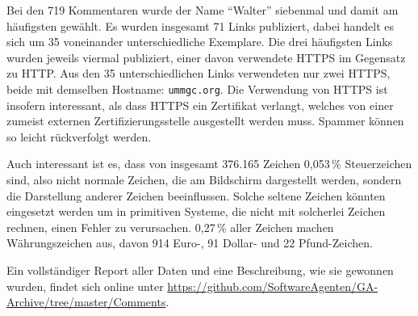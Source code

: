 Bei den 719 Kommentaren wurde der Name \enquote{Walter} siebenmal und damit am
häufigsten gewählt. Es wurden insgesamt 71 Links publiziert, dabei handelt es
sich um 35 voneinander unterschiedliche Exemplare. Die drei häufigsten Links
wurden jeweils viermal publiziert, einer davon verwendete HTTPS im Gegensatz zu
HTTP. Aus den 35 unterschiedlichen Links verwendeten nur zwei HTTPS, beide mit
demselben Hostname: \texttt{ummgc.org}. Die Verwendung von HTTPS ist insofern
interessant, als dass HTTPS ein Zertifikat verlangt, welches von einer zumeist
externen Zertifizierungsstelle ausgestellt werden muss. Spammer können so
leicht rückverfolgt werden.

Auch interessant ist es, dass von insgesamt 376.165 Zeichen 0,053\,\%
Steuerzeichen sind, also nicht normale Zeichen, die am Bildschirm dargestellt
werden, sondern die Darstellung anderer Zeichen beeinflussen. Solche seltene
Zeichen könnten eingesetzt werden um in primitiven Systeme, die nicht mit
solcherlei Zeichen rechnen, einen Fehler zu verursachen. 0,27\,\% aller Zeichen
machen Währungszeichen aus, davon 914 Euro-, 91 Dollar- und 22 Pfund-Zeichen.

Ein vollständiger Report aller Daten und eine Beschreibung, wie sie gewonnen
wurden, findet sich online unter
\url{https://github.com/SoftwareAgenten/GA-Archive/tree/master/Comments}.
